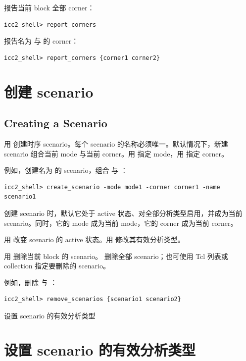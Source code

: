 报告当前 block 全部 corner：
\begin{lstlisting}
icc2_shell> report_corners
\end{lstlisting}

报告名为  与  的 corner：
\begin{lstlisting}
icc2_shell> report_corners {corner1 corner2}
\end{lstlisting}

\section{创建 scenario}
\subsection*{Creating a Scenario}

用  创建时序 scenario。每个 scenario 的名称必须唯一。默认情况下，新建 scenario 组合当前 mode 与当前 corner。用  指定 mode，用  指定 corner。

例如，创建名为  的 scenario，组合  与 ：
\begin{lstlisting}
icc2_shell> create_scenario -mode mode1 -corner corner1 -name scenario1
\end{lstlisting}

创建 scenario 时，默认它处于 active 状态、对全部分析类型启用，并成为当前 scenario。同时，它的 mode 成为当前 mode，它的 corner 成为当前 corner。

用  改变 scenario 的 active 状态。用  修改其有效分析类型。

用  删除当前 block 的 scenario。 删除全部 scenario；也可使用 Tcl 列表或 collection 指定要删除的 scenario。

例如，删除  与 ：
\begin{lstlisting}
icc2_shell> remove_scenarios {scenario1 scenario2}
\end{lstlisting}

\begin{seeAlsoBox}
设置 scenario 的有效分析类型
\end{seeAlsoBox}

\section{设置 scenario 的有效分析类型}
